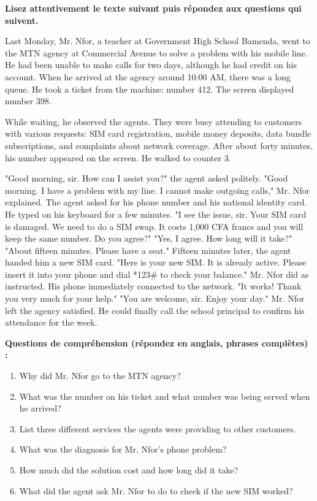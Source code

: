 \documentclass[11pt]{article}
\begin{document}
\begin{exercice}
\textbf{Lisez attentivement le texte suivant puis répondez aux questions qui suivent.}
\begin{textebox}
Last Monday, Mr. Nfor, a teacher at Government High School Bamenda, went to the MTN agency at Commercial Avenue to solve a problem with his mobile line. He had been unable to make calls for two days, although he had credit on his account. When he arrived at the agency around 10:00 AM, there was a long queue. He took a ticket from the machine: number 412. The screen displayed number 398.

While waiting, he observed the agents. They were busy attending to customers with various requests: SIM card registration, mobile money deposits, data bundle subscriptions, and complaints about network coverage. After about forty minutes, his number appeared on the screen. He walked to counter 3.

"Good morning, sir. How can I assist you?" the agent asked politely.
"Good morning. I have a problem with my line. I cannot make outgoing calls," Mr. Nfor explained.
The agent asked for his phone number and his national identity card. He typed on his keyboard for a few minutes. "I see the issue, sir. Your SIM card is damaged. We need to do a SIM swap. It costs 1,000 CFA francs and you will keep the same number. Do you agree?"
"Yes, I agree. How long will it take?"
"About fifteen minutes. Please have a seat."
Fifteen minutes later, the agent handed him a new SIM card. "Here is your new SIM. It is already active. Please insert it into your phone and dial *123\# to check your balance."
Mr. Nfor did as instructed. His phone immediately connected to the network. "It works! Thank you very much for your help."
"You are welcome, sir. Enjoy your day."
Mr. Nfor left the agency satisfied. He could finally call the school principal to confirm his attendance for the week.
\end{textebox}

\textbf{Questions de compréhension (répondez en anglais, phrases complètes) :}
\begin{enumerate}
\item Why did Mr. Nfor go to the MTN agency?
\item What was the number on his ticket and what number was being served when he arrived?
\item List three different services the agents were providing to other customers.
\item What was the diagnosis for Mr. Nfor's phone problem?
\item How much did the solution cost and how long did it take?
\item What did the agent ask Mr. Nfor to do to check if the new SIM worked?
\end{enumerate}


\end{exercice}
\end{document}
